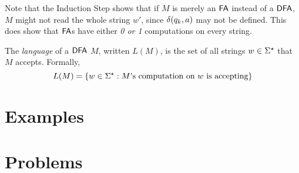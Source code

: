 Note that the Induction Step shows that if $M$ is merely an $\textsf{FA}$ instead of a $\textsf{DFA}$, $M$ might not read the whole string $w'$, since $\delta(q_k, a)$ may not be defined.
This does show that $\textsf{FA}$s have either \emph{0 or 1} computations on every string.

The \textit{language} of a $\textsf{DFA}$ $M$, written $L(M)$, is the set of all strings $w \in \Sigma^\star$ that $M$ accepts. Formally,
\[
	L(M) = \{ w \in \Sigma^\star : \text{$M$'s computation on $w$ is accepting}\}
\]



\section{Examples}



\section{Problems}